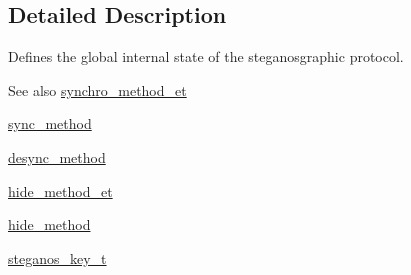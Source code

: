 \subsection{Detailed Description}
Defines the global internal state of the steganosgraphic protocol. \begin{DoxySeeAlso}{See also}
\hyperlink{steganos__types_8h_a1a1afa313dff1694d410bace75c29961}{synchro\_\-method\_\-et} 

\hyperlink{steganos__types_8h_ac758d5077b8857eb7a2059be7f6b2e03}{sync\_\-method} 

\hyperlink{steganos__types_8h_a3423b8602d2248745bfd5ff836dafe31}{desync\_\-method} 

\hyperlink{steganos__types_8h_af9031c1f060b0b2c34fcd5a3cc32ffbd}{hide\_\-method\_\-et} 

\hyperlink{structsteganos__state__t_ad48f948c5024ec76b3a9bece54124d66}{hide\_\-method} 

\hyperlink{structsteganos__key__t}{steganos\_\-key\_\-t} 
\end{DoxySeeAlso}


